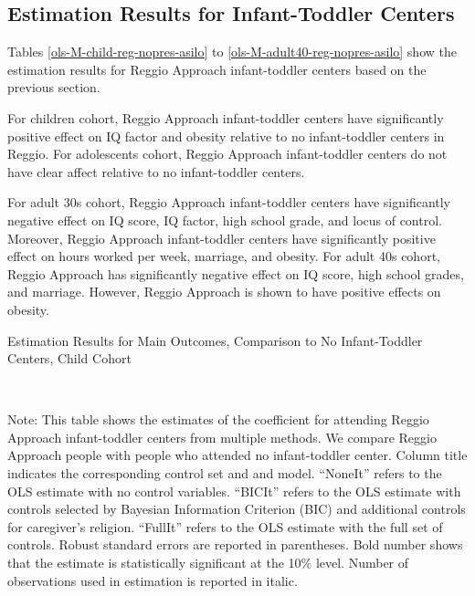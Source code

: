 

\subsection{Estimation Results for Infant-Toddler Centers}


Tables \ref{ols-M-child-reg-nopres-asilo} to \ref{ols-M-adult40-reg-nopres-asilo} show the estimation results for Reggio Approach infant-toddler centers based on the previous section. 

For children cohort, Reggio Approach infant-toddler centers have significantly positive effect on IQ factor and obesity relative to no infant-toddler centers in Reggio. For adolescents cohort, Reggio Approach infant-toddler centers do not have clear affect relative to no infant-toddler centers. 

For adult 30s cohort, Reggio Approach infant-toddler centers have significantly negative effect on IQ score, IQ factor, high school grade, and locus of control. Moreover, Reggio Approach infant-toddler centers have significantly positive effect on hours worked per week, marriage, and obesity. For adult 40s cohort, Reggio Approach has significantly negative effect on IQ score, high school grades, and marriage. However, Reggio Approach is shown to have positive effects on obesity. 


\begin{table}[H] \caption{Estimation Results for Main Outcomes, Comparison to No Infant-Toddler Centers, Child Cohort} \label{ols-M-child-reg-nopres-asilo}
\scalebox{0.8}{}
\vspace{1ex} \\
\footnotesize\raggedright{Note: This table shows the estimates of the coefficient for attending Reggio Approach infant-toddler centers from multiple methods. We compare Reggio Approach people with people who attended no infant-toddler center. Column title indicates the corresponding control set and and model. ``NoneIt'' refers to the OLS estimate with no control variables. ``BICIt'' refers to the OLS estimate with controls selected by Bayesian Information Criterion (BIC) and additional controls for caregiver's religion. ``FullIt'' refers to the OLS estimate with the full set of controls. Robust standard errors are reported in parentheses. Bold number shows that the estimate is statistically significant at the 10\% level. Number of observations used in estimation is reported in italic.}

\end{table}

